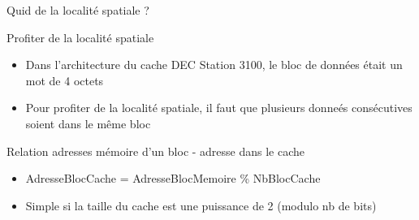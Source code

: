 %
\begin{Frame}{Quid de la localité spatiale ?}


      \begin{block}{Profiter de la localité spatiale}
       \begin{center}
 	\begin{itemize}
         \item Dans l'architecture du cache DEC Station 3100, le bloc de données était un mot de 4 octets
         \item Pour profiter de la localité spatiale, il faut que plusieurs donneés consécutives soient dans le même bloc
        \end{itemize}
       \end{center}
      \end{block}   

  

  \begin{block}{Relation adresses mémoire d'un bloc - adresse dans le cache}
    \begin{center}
 	\begin{itemize}
	\item AdresseBlocCache = AdresseBlocMemoire \% NbBlocCache
	\item Simple si la taille du cache est une puissance de 2 (modulo nb de bits)
        \end{itemize}
    \end{center}
  \end{block}   

 

\end{Frame}


